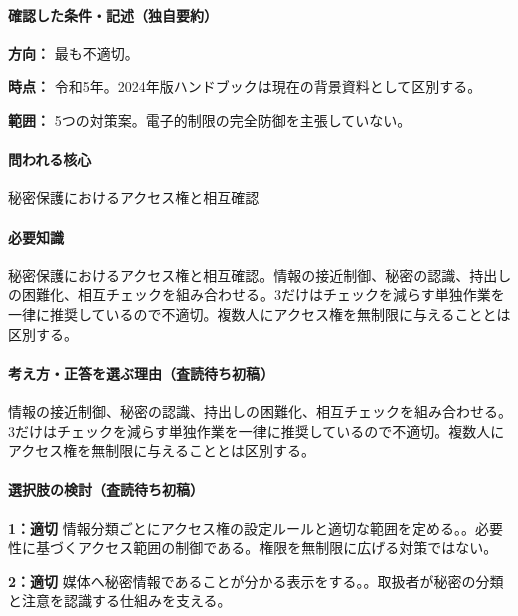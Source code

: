 \paragraph{確認した条件・記述（独自要約）}\mbox{}\par

\noindent\textbf{方向：} 最も不適切。\par

\noindent\textbf{時点：} 令和5年。2024年版ハンドブックは現在の背景資料として区別する。\par

\noindent\textbf{範囲：} 5つの対策案。電子的制限の完全防御を主張していない。\par

\paragraph{問われる核心} 秘密保護におけるアクセス権と相互確認

\paragraph{必要知識} 秘密保護におけるアクセス権と相互確認。情報の接近制御、秘密の認識、持出しの困難化、相互チェックを組み合わせる。3だけはチェックを減らす単独作業を一律に推奨しているので不適切。複数人にアクセス権を無制限に与えることとは区別する。

\paragraph{考え方・正答を選ぶ理由（査読待ち初稿）} 情報の接近制御、秘密の認識、持出しの困難化、相互チェックを組み合わせる。3だけはチェックを減らす単独作業を一律に推奨しているので不適切。複数人にアクセス権を無制限に与えることとは区別する。

\paragraph{選択肢の検討（査読待ち初稿）}\mbox{}\par

\noindent\textbf{1：適切} 情報分類ごとにアクセス権の設定ルールと適切な範囲を定める。。必要性に基づくアクセス範囲の制御である。権限を無制限に広げる対策ではない。\par

\noindent\textbf{2：適切} 媒体へ秘密情報であることが分かる表示をする。。取扱者が秘密の分類と注意を認識する仕組みを支える。\par

